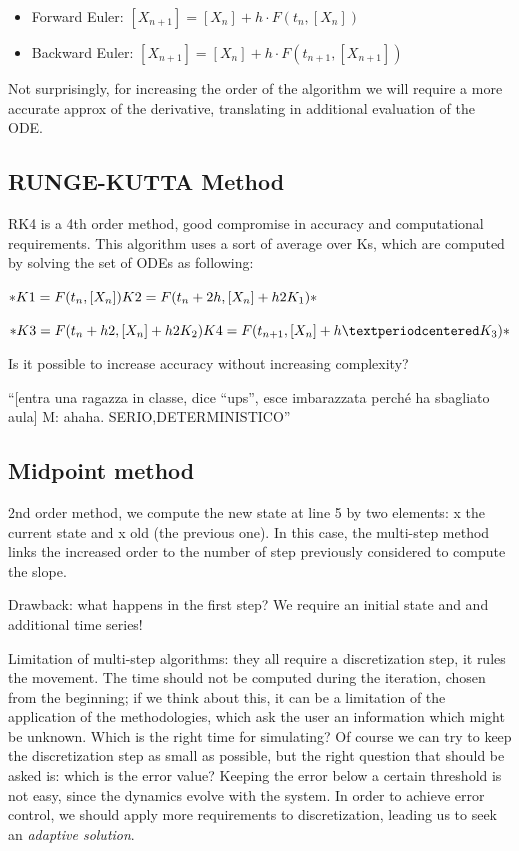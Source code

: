 \begin{itemize}
\tightlist
\item
  Forward Euler: $[X_{n+1}] = [X_n]+h·F(t_n,[X_n])$
\item
  Backward Euler: $[X_{n+1}] = [X_n]+h·F(t_{n+1},[X_{n+1}])$
\end{itemize}

Not surprisingly, for increasing the order of the algorithm we will
require a more accurate approx of the derivative, translating in
additional evaluation of the ODE.

\hypertarget{runge-kutta-method}{%
\subsection{RUNGE-KUTTA Method}\label{runge-kutta-method}}

RK4 is a 4th order method, good compromise in accuracy and computational
requirements. This algorithm uses a sort of average over Ks, which are
computed by solving the set of ODEs as following:

$*K1 = F(t_n,[X_n])\\ K2 = F(t_n + 2h,[X_n]+ h2K_1)*$

$*K3 = F(t_n + h2,[X_n]+ h2K_2)\\ K4 = F(t_{n+1},[X_n]+h·K_3)*$

Is it possible to increase accuracy without increasing complexity?

``{[}entra una ragazza in classe, dice ``ups'', esce imbarazzata perché
ha sbagliato aula{]} M: ahaha. SERIO,DETERMINISTICO''

\hypertarget{midpoint-method}{%
\subsection{Midpoint method}\label{midpoint-method}}

2nd order method, we compute the new state at line 5 by two elements: x
the current state and x old (the previous one). In this case, the
multi-step method links the increased order to the number of step
previously considered to compute the slope.

Drawback: what happens in the first step? We require an initial state
and and additional time series!

Limitation of multi-step algorithms: they all require a discretization
step, it rules the movement. The time should not be computed during the
iteration, chosen from the beginning; if we think about this, it can be
a limitation of the application of the methodologies, which ask the user
an information which might be unknown. Which is the right time for
simulating? Of course we can try to keep the discretization step as
small as possible, but the right question that should be asked is: which
is the error value? Keeping the error below a certain threshold is not
easy, since the dynamics evolve with the system. In order to achieve
error control, we should apply more requirements to discretization,
leading us to seek an \emph{adaptive solution}.

